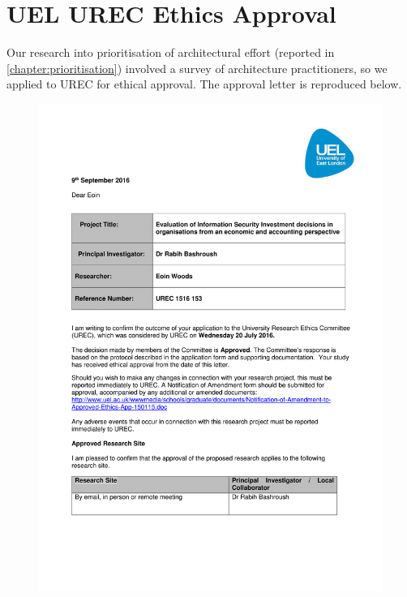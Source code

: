 \chapter {UEL UREC Ethics Approval}

Our research into prioritisation of architectural effort (reported in \cref{chapter:prioritisation}) involved a survey of architecture practitioners, so we applied to UREC for ethical approval.  The approval letter is reproduced below.
\begin{center}
\begin{figure}[h]
\includegraphics[width=1.0\linewidth]{Figures/EoinWoods-UREC-approval-letter-090916-1}
\end{figure}
\clearpage
\begin{figure}[h]

\end{figure}
\end{center}
